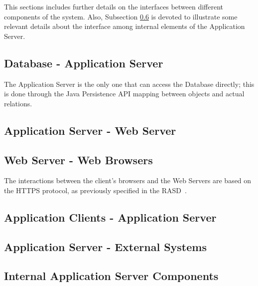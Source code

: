 This sections includes further details on the interfaces between different components of the system. Also, Subsection \ref{int_comps_if} is devoted to illustrate some relevant details about the interface among internal elements of the Application Server.

\subsection{Database - Application Server}
The Application Server is the only one that can access the Database directly; this is done through the Java Persistence API mapping between objects and actual relations.

\subsection{Application Server - Web Server}

\subsection{Web Server - Web Browsers}
The interactions between the client's browsers and the Web Servers are based on the HTTPS protocol, as previously specified in the RASD~\cite{rasd}.

\subsection{Application Clients - Application Server}

\subsection{Application Server - External Systems}

\subsection{Internal Application Server Components}\label{int_comps_if}